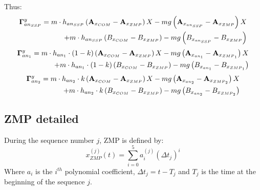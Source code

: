 \documentclass[journal]{IEEEtran}
\begin{document}
Thus:
\begin{equation}
\begin{split}
\mathbf{\Gamma}^y_{an_{SSP}}=m\cdot h_{an_{SSP}} \left(\mathbf{A}_{x_{\mbox{\tiny COM}}}- \mathbf{A}_{x_{\mbox{\tiny ZMP}}} \right) X -mg\left(\mathbf{A}_{x_{an_{SSP}}}-\mathbf{A}_{x_{\mbox{\tiny ZMP}}}\right)X\\
+m\cdot h_{an_{SSP}} \left(B_{x_{\mbox{\tiny COM}}}- B_{x_{\mbox{\tiny ZMP}}} \right)-mg\left(B_{x_{an_{SSP}}}-B_{x_{\mbox{\tiny ZMP}}}\right)
\end{split}
\end{equation}
\begin{equation}
\begin{split}
\mathbf{\Gamma}^y_{an_{1}}=m\cdot h_{an_{1}} \cdot (1-k) \left(\mathbf{A}_{x_{\mbox{\tiny COM}}}- \mathbf{A}_{x_{\mbox{\tiny ZMP}}} \right) X -mg\left(\mathbf{A}_{x_{an_{1}}}-\mathbf{A}_{x_{\mbox{\tiny ZMP}_{1}}}\right)X\\
+m\cdot h_{an_{1}} \cdot (1-k) \left(B_{x_{\mbox{\tiny COM}}}- B_{x_{\mbox{\tiny ZMP}}} \right)-mg\left(B_{x_{an_{1}}}-B_{x_{\mbox{\tiny ZMP}_{1}}}\right)
\end{split}
\end{equation}
\begin{equation}
\begin{split}
\mathbf{\Gamma}^y_{an_{2}}=m\cdot h_{an_{2}} \cdot k \left(\mathbf{A}_{x_{\mbox{\tiny COM}}}- \mathbf{A}_{x_{\mbox{\tiny ZMP}}} \right) X -mg\left(\mathbf{A}_{x_{an_{2}}}-\mathbf{A}_{x_{\mbox{\tiny ZMP}_{2}}}\right)X\\
+m\cdot h_{an_{2}} \cdot k \left(B_{x_{\mbox{\tiny COM}}}- B_{x_{\mbox{\tiny ZMP}}} \right)-mg\left(B_{x_{an_{2}}}-B_{x_{\mbox{\tiny ZMP}_{2}}}\right)
\end{split}
\end{equation}

\subsection{ZMP detailed}
During the sequence number $j$, ZMP is defined by:
\begin{equation}
\label{eq:zmp_global}
x_{ZMP}^{(j)}(t)=\sum_{i=0}^{5}a_{i}^{(j)}(\Delta t_{j})^{i}
\end{equation}
Where $a_{i}$ is the $i^{th}$ polynomial coefficient, $\Delta t_{j}=t-T_j$ and $T_j$ is the time at the beginning of the sequence $j$.
\end{document}
